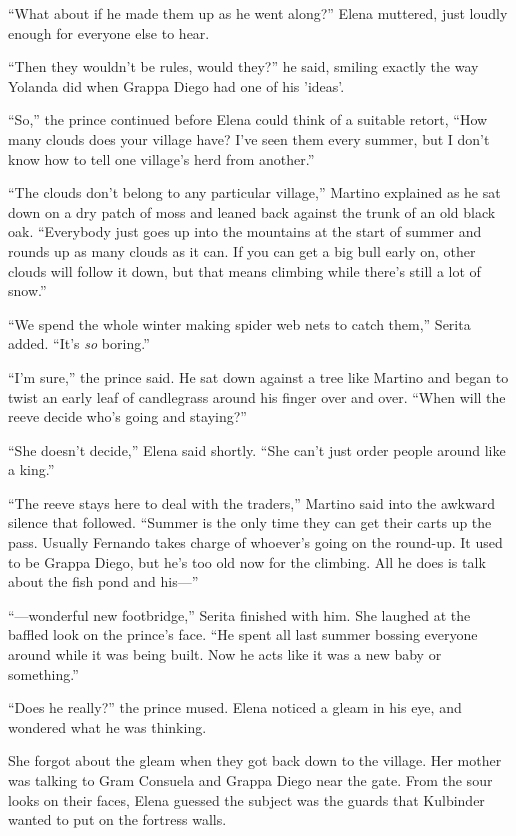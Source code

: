 \documentclass[10pt]{book}
\begin{document}
``What about if he made them up as he went along?'' Elena muttered, just loudly enough for everyone else to hear.

``Then they wouldn't be rules, would they?'' he said, smiling exactly the way Yolanda did when Grappa Diego had one of his 'ideas'.

``So,'' the prince continued before Elena could think of a suitable retort, ``How many clouds does your village have? I've seen them every summer, but I don't know how to tell one village's herd from another.''

``The clouds don't belong to any particular village,'' Martino explained as he sat down on a dry patch of moss and leaned back against the trunk of an old black oak. ``Everybody just goes up into the mountains at the start of summer and rounds up as many clouds as it can. If you can get a big bull early on, other clouds will follow it down, but that means climbing while there's still a lot of snow.''

``We spend the whole winter making spider web nets to catch them,'' Serita added. ``It's \emph{so} boring.''

``I'm sure,'' the prince said. He sat down against a tree like Martino and began to twist an early leaf of candlegrass around his finger over and over. ``When will the reeve decide who's going and staying?''

``She doesn't decide,'' Elena said shortly. ``She can't just order people around like a king.''

``The reeve stays here to deal with the traders,'' Martino said into the awkward silence that followed. ``Summer is the only time they can get their carts up the pass. Usually Fernando takes charge of whoever's going on the round-up. It used to be Grappa Diego, but he's too old now for the climbing. All he does is talk about the fish pond and his---''

``---wonderful new footbridge,'' Serita finished with him. She laughed at the baffled look on the prince's face. ``He spent all last summer bossing everyone around while it was being built. Now he acts like it was a new baby or something.''

``Does he really?'' the prince mused. Elena noticed a gleam in his eye, and wondered what he was thinking.

She forgot about the gleam when they got back down to the village. Her mother was talking to Gram Consuela and Grappa Diego near the gate. From the sour looks on their faces, Elena guessed the subject was the guards that Kulbinder wanted to put on the fortress walls.
\end{document}
